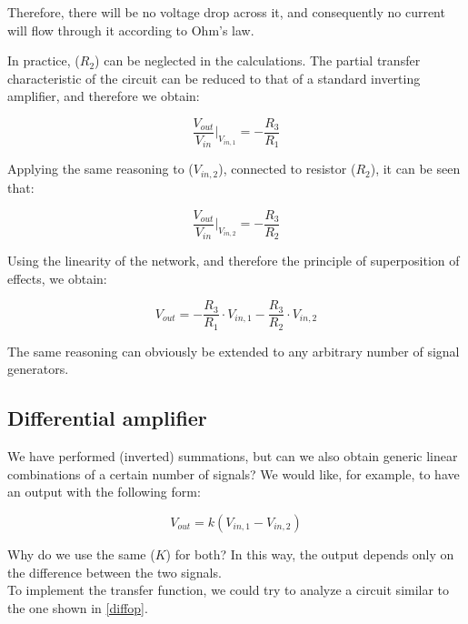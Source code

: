 \documentclass[../main.tex]{subfiles}
\begin{document}
Therefore, there will be no voltage drop across it, and consequently no current will flow through it according to Ohm’s law. 

In practice, ($R_2$) can be neglected in the calculations. The partial transfer characteristic of the circuit can be reduced to that of a standard inverting amplifier, and therefore we obtain:

\begin{equation}
	\frac{V_{out}}{V_{in}} \bigg|_{V_{in,1}} = - \frac{R_3}{R_1}
\end{equation}

Applying the same reasoning to ($V_{in,2}$), connected to resistor ($R_2$), it can be seen that:

\begin{equation}
	\frac{V_{out}}{V_{in}} \bigg|_{V_{in,2}} = - \frac{R_3}{R_2}
\end{equation}

Using the linearity of the network, and therefore the principle of superposition of effects, we obtain:

\begin{equation}
	V_{out} = - \frac{R_3}{R_1} \cdot V_{in,1} - \frac{R_3}{R_2} \cdot V_{in,2}
\end{equation}

The same reasoning can obviously be extended to any arbitrary number of signal generators.

\subsection{Differential amplifier}


We have performed (inverted) summations, but can we also obtain generic linear combinations of a certain number of signals? We would like, for example, to have an output with the following form:


\begin{equation}
	V_{out} = k (V_{in,1} - V_{in,2})
\end{equation}

Why do we use the same ($K$) for both? In this way, the output depends only on the difference between the two signals.\\

To implement the transfer function, we could try to analyze a circuit similar to the one shown in \autoref{diffop}.
\end{document}
